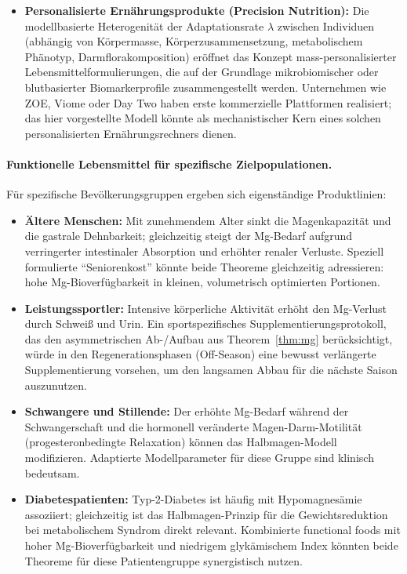 ﻿\documentclass[12pt,a4paper]{article}
\theoremstyle{plain}
\theoremstyle{definition}
\theoremstyle{remark}
\begin{document}
\begin{itemize}
        ist. Die Digitalisierung des Halbmagen-Prinzips über
        Consumer-Technologie (vernetzte Waagen, KI-gestützte
        Bilderkennung von Portionsgrößen) bietet ein erhebliches
        Marktpotenzial im Bereich \emph{Digital Nutrition}.
  \item \textbf{Personalisierte Ernährungsprodukte (Precision Nutrition):}
        Die modellbasierte Heterogenität der Adaptationsrate $\lambda$
        zwischen Individuen (abhängig von Körpermasse, Körperzusammensetzung,
        metabolischem Phänotyp, Darmflorakomposition) eröffnet das
        Konzept mass-personalisierter Lebensmittelformulierungen, die
        auf der Grundlage mikrobiomischer oder blutbasierter
        Biomarkerprofile zusammengestellt werden. Unternehmen wie
        ZOE, Viome oder Day Two haben erste kommerzielle Plattformen
        realisiert; das hier vorgestellte Modell könnte als
        mechanistischer Kern eines solchen personalisierten
        Ernährungsrechners dienen.
\end{itemize}

\paragraph{Funktionelle Lebensmittel für spezifische Zielpopulationen.}
Für spezifische Bevölkerungsgruppen ergeben sich eigenständige
Produktlinien:
\begin{itemize}
  \item \textbf{Ältere Menschen:} Mit zunehmendem Alter sinkt die
        Magenkapazität und die gastrale Dehnbarkeit; gleichzeitig steigt
        der Mg-Bedarf aufgrund verringerter intestinaler Absorption und
        erhöhter renaler Verluste. Speziell formulierte
        ``Seniorenkost'' könnte beide Theoreme gleichzeitig adressieren:
        hohe Mg-Bioverfügbarkeit in kleinen, volumetrisch optimierten
        Portionen.
  \item \textbf{Leistungssportler:} Intensive körperliche Aktivität
        erhöht den Mg-Verlust durch Schweiß und Urin. Ein
        sportspezifisches Supplementierungsprotokoll, das den
        asymmetrischen Ab-/Aufbau aus Theorem~\ref{thm:mg} berücksichtigt,
        würde in den Regenerationsphasen (Off-Season) eine bewusst
        verlängerte Supplementierung vorsehen, um den langsamen Abbau für
        die nächste Saison auszunutzen.
  \item \textbf{Schwangere und Stillende:} Der erhöhte Mg-Bedarf
        während der Schwangerschaft und die hormonell veränderte
        Magen-Darm-Motilität (progesteronbedingte Relaxation) können das
        Halbmagen-Modell modifizieren. Adaptierte Modellparameter für
        diese Gruppe sind klinisch bedeutsam.
  \item \textbf{Diabetespatienten:} Typ-2-Diabetes ist häufig mit
        Hypomagnesämie assoziiert; gleichzeitig ist das Halbmagen-Prinzip
        für die Gewichtsreduktion bei metabolischem Syndrom direkt
        relevant. Kombinierte functional foods mit hoher Mg-Bioverfügbarkeit
        und niedrigem glykämischem Index könnten beide Theoreme für diese
        Patientengruppe synergistisch nutzen.
\end{itemize}
\end{document}
